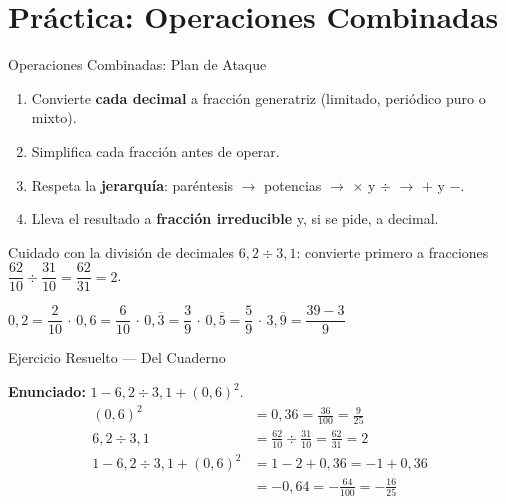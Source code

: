 \documentclass[aspectratio=169]{beamer}
\begin{document}
\section{Práctica: Operaciones Combinadas}

\begin{frame}{Operaciones Combinadas: Plan de Ataque}
  \begin{mwpasos}[Procedimiento]
    \begin{enumerate}
      \item Convierte \textbf{cada decimal} a fracción generatriz
            (limitado, periódico puro o mixto).
      \item Simplifica cada fracción antes de operar.
      \item Respeta la \textbf{jerarquía}: paréntesis $\to$
            potencias $\to$ $\times$ y $\div$ $\to$ $+$ y $-$.
      \item Lleva el resultado a \textbf{fracción irreducible} y, si se
            pide, a decimal.
    \end{enumerate}
  \end{mwpasos}
  \begin{alertblock}{Cuidado con la división de decimales}
    $6{,}2 \div 3{,}1$: convierte primero a fracciones
    $\dfrac{62}{10} \div \dfrac{31}{10} = \dfrac{62}{31} = 2$.
  \end{alertblock}
  \vspace{2pt}
  \begin{mwextra}
    $0{,}2 = \dfrac{2}{10}$ \quad$\cdot$\quad
    $0{,}6 = \dfrac{6}{10}$ \quad$\cdot$\quad
    $0{,}\overline{3} = \dfrac{3}{9}$ \quad$\cdot$\quad
    $0{,}\overline{5} = \dfrac{5}{9}$ \quad$\cdot$\quad
    $3{,}\overline{9} = \dfrac{39 - 3}{9}$
  \end{mwextra}
\end{frame}

\begin{frame}{Ejercicio Resuelto — Del Cuaderno}
  \mwtopanchoroff
  \begin{mwpasos}
    \textbf{Enunciado: } $1 - 6{,}2 \div 3{,}1 + (0{,}6)^{2}$.
    \begin{align*}
      (0{,}6)^{2} &= 0{,}36 = \frac{36}{100} = \frac{9}{25} \\
      6{,}2 \div 3{,}1
        &= \frac{62}{10} \div \frac{31}{10}
         = \frac{62}{31} = 2 \\
      1 - 6{,}2 \div 3{,}1 + (0{,}6)^{2}
        &= 1 - 2 + 0{,}36 = -1 + 0{,}36 \\
        &= -0{,}64 = -\frac{64}{100} = -\frac{16}{25}
    \end{align*}
  \end{mwpasos}
  \mwtopanchoron
\end{frame}
\end{document}
